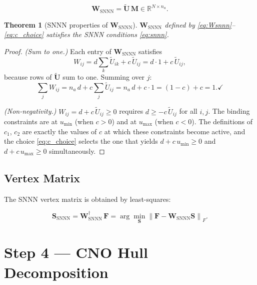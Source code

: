 \documentclass[11pt]{article}
\theoremstyle{definition}
\theoremstyle{plain}
\newtheorem{theorem}{Theorem}[section]
\newcommand{\R}{\mathbb{R}}
\newcommand{\mat}[1]{\mathbf{#1}}
\newcommand{\norm}[1]{\left\|#1\right\|}
\newcommand{\pinv}[1]{#1^{\dagger}}
\begin{document}
\begin{equation}
  \mat{W}_{\mathrm{SNNN}} = \tilde{\mat{U}}\,\mat{M} \in \R^{N \times n_a}.
  \label{eq:Wsnnn}
\end{equation}

\begin{theorem}[SNNN properties of $\mat{W}_{\mathrm{SNNN}}$]
  $\mat{W}_{\mathrm{SNNN}}$ defined by \eqref{eq:Wsnnn}--\eqref{eq:c_choice}
  satisfies the SNNN conditions \eqref{eq:snnn}.
\end{theorem}

\begin{proof}
  \textit{(Sum to one.)} \;
  Each entry of $\mat{W}_{\mathrm{SNNN}}$ satisfies
  \[
    W_{ij} = d\sum_{k}\tilde{U}_{ik} + c\,\tilde{U}_{ij}
           = d\cdot 1 + c\,\tilde{U}_{ij},
  \]
  because rows of $\tilde{\mat{U}}$ sum to one.  Summing over $j$:
  \[
    \sum_j W_{ij} = n_a\,d + c\sum_j \tilde{U}_{ij} = n_a\,d + c\cdot 1 = (1-c)+c = 1. \checkmark
  \]

  \textit{(Non-negativity.)} \;
  $W_{ij} = d + c\,\tilde{U}_{ij} \ge 0$ requires
  $d \ge -c\,\tilde{U}_{ij}$ for all $i,j$.
  The binding constraints are at $u_{\min}$ (when $c>0$) and at $u_{\max}$
  (when $c<0$).  The definitions of $c_1$, $c_2$ are exactly the values of
  $c$ at which these constraints become active, and the choice
  \eqref{eq:c_choice} selects the one that yields $d + c\,u_{\min} \ge 0$
  and $d + c\,u_{\max} \ge 0$ simultaneously. \checkmark
\end{proof}

\subsection{Vertex Matrix}

The SNNN vertex matrix is obtained by least-squares:

\begin{equation}
  \mat{S}_{\mathrm{SNNN}} = \pinv{\mat{W}_{\mathrm{SNNN}}}\,\mat{F}
  = \arg\min_{\mat{S}} \norm{\mat{F} - \mat{W}_{\mathrm{SNNN}}\mat{S}}_F.
  \label{eq:Ssnnn}
\end{equation}


\section{Step 4 --- CNO Hull Decomposition}
\end{document}
